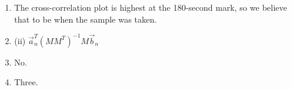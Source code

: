 \documentclass[11pt]{article}
\newenvironment{qparts}{\begin{enumerate}[{(}a{)}]}{\end{enumerate}}
\begin{document}
\begin{qparts}
\begin{align*}
    e_3 &= \vec{x}_{sample} - proj_{\vec{x_3}}\vec{x}_{sample} = \begin{bmatrix}0.96&0& -0.48& 0.48\end{bmatrix}^T&
\end{align*}
Now, we find the error vector which has the smallest magnitude; the song that corresponds with this minimum-difference vector is likeliest song of the three to be playing according to the sample footprint.
\begin{align*}
    ||e_1|| = 2.45 \\
    ||e_2|| = 0.36 \\
    ||e_3|| = 1.48
\end{align*}
We conclude that the song playing must be Electric Feel.
\item
The cross-correlation plot is highest at the 180-second mark, so we believe that to be when the sample was taken.
\item
(ii) $\vec{a}_n^T (M M^T)^{-1} M \vec{b}_n$
\item
No.
\item
Three.
\end{qparts}

\newpage
\end{document}
